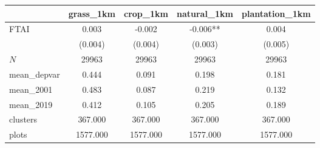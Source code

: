 {
\def\sym#1{\ifmmode^{#1}\else\(^{#1}\)\fi}
\begin{tabular}{l*{4}{c}}
\toprule
          &\multicolumn{1}{c}{grass\_1km}&\multicolumn{1}{c}{crop\_1km}&\multicolumn{1}{c}{natural\_1km}&\multicolumn{1}{c}{plantation\_1km}\\
\midrule
FTAI      &    0.003   &   -0.002   &   -0.006** &    0.004   \\
          &  (0.004)   &  (0.004)   &  (0.003)   &  (0.005)   \\
\midrule
\(N\)     &    29963   &    29963   &    29963   &    29963   \\
mean\_depvar&    0.444   &    0.091   &    0.198   &    0.181   \\
mean\_2001 &    0.483   &    0.087   &    0.219   &    0.132   \\
mean\_2019 &    0.412   &    0.105   &    0.205   &    0.189   \\
clusters  &  367.000   &  367.000   &  367.000   &  367.000   \\
plots     & 1577.000   & 1577.000   & 1577.000   & 1577.000   \\
\bottomrule
\end{tabular}
}

